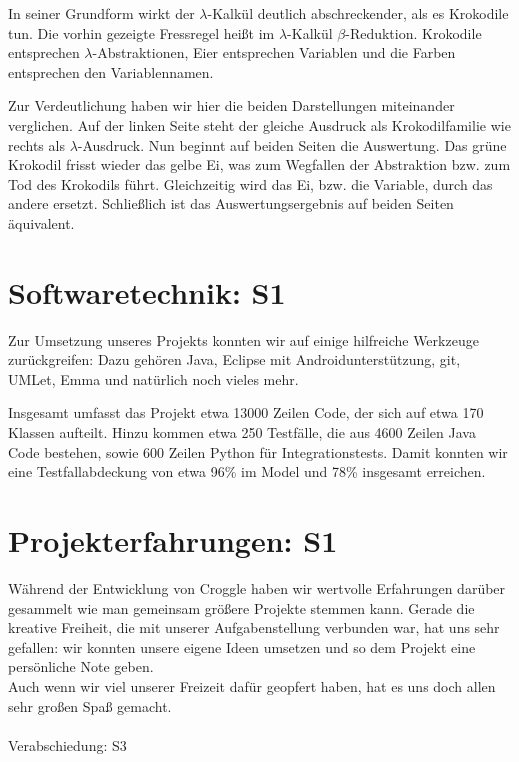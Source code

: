 \documentclass{scrartcl}
\begin{document}
	In seiner Grundform wirkt der $\lambda$-Kalkül deutlich abschreckender, als es Krokodile tun.
	Die vorhin gezeigte Fressregel heißt im $\lambda$-Kalkül $\beta$-Reduktion.
	Krokodile entsprechen $\lambda$-Abstraktionen, Eier entsprechen Variablen und die Farben entsprechen den Variablennamen.

	Zur Verdeutlichung haben wir hier die beiden Darstellungen miteinander verglichen.
	Auf der linken Seite steht der gleiche Ausdruck als Krokodilfamilie wie rechts als $\lambda$-Ausdruck.
	Nun beginnt auf beiden Seiten die Auswertung.
	Das grüne Krokodil frisst wieder das gelbe Ei, was zum Wegfallen der Abstraktion bzw. zum Tod des Krokodils führt.
	Gleichzeitig wird das Ei, bzw. die Variable, durch das andere ersetzt.
	Schließlich ist das Auswertungsergebnis auf beiden Seiten äquivalent.

	\section{Softwaretechnik: S1}
	Zur Umsetzung unseres Projekts konnten wir auf einige hilfreiche Werkzeuge zurückgreifen:
	Dazu gehören Java, Eclipse mit Androidunterstützung, git, UMLet, Emma und natürlich noch vieles mehr.

	Insgesamt umfasst das Projekt etwa 13000 Zeilen Code, der sich auf etwa 170 Klassen aufteilt.
	Hinzu kommen etwa 250 Testfälle, die aus 4600 Zeilen Java Code bestehen, sowie 600 Zeilen Python für Integrationstests.
	Damit konnten wir eine Testfallabdeckung von etwa 96\% im Model und 78\% insgesamt erreichen.

	\section{Projekterfahrungen: S1}

	Während der Entwicklung von Croggle haben wir wertvolle Erfahrungen darüber gesammelt wie man gemeinsam größere Projekte stemmen kann. 
	Gerade die kreative Freiheit, die mit unserer Aufgabenstellung verbunden war, hat uns sehr gefallen: wir konnten unsere eigene Ideen umsetzen und so dem Projekt eine persönliche Note geben. \\
	Auch wenn wir viel unserer Freizeit dafür geopfert haben, hat es uns doch allen sehr großen Spaß gemacht.
\\
\ \\
	Verabschiedung: S3
     
\end{document}
